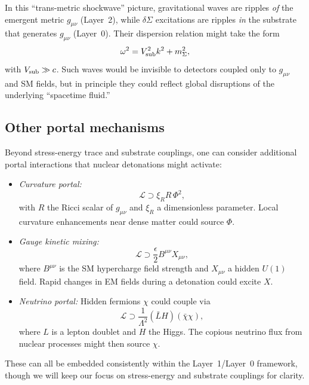 \documentclass[aps,prd,twocolumn,nofootinbib,superscriptaddress]{revtex4-2}
\begin{document}
In this ``trans-metric shockwave'' picture, gravitational waves are ripples \emph{of} the emergent metric $g_{\mu\nu}$ (Layer~2), while $\delta\Sigma$ excitations are ripples \emph{in} the substrate that generates $g_{\mu\nu}$ (Layer~0). Their dispersion relation might take the form
\begin{equation}
    \omega^2 = V_{\rm sub}^2 k^2 + m_\Sigma^2,
    \label{eq:sigma_dispersion}
\end{equation}
with $V_{\rm sub} \gg c$. Such waves would be invisible to detectors coupled only to $g_{\mu\nu}$ and SM fields, but in principle they could reflect global disruptions of the underlying ``spacetime fluid.''

\subsection{Other portal mechanisms}

Beyond stress-energy trace and substrate couplings, one can consider additional portal interactions that nuclear detonations might activate:
\begin{itemize}
    \item \textit{Curvature portal:}
    \begin{equation}
        \mathcal{L} \supset \xi_R R \, \Phi^2,
    \end{equation}
    with $R$ the Ricci scalar of $g_{\mu\nu}$ and $\xi_R$ a dimensionless parameter. Local curvature enhancements near dense matter could source $\Phi$.
    \item \textit{Gauge kinetic mixing:}
    \begin{equation}
        \mathcal{L} \supset \frac{\epsilon}{2} B^{\mu\nu} X_{\mu\nu},
    \end{equation}
    where $B^{\mu\nu}$ is the SM hypercharge field strength and $X_{\mu\nu}$ a hidden $U(1)$ field. Rapid changes in EM fields during a detonation could excite $X$.
    \item \textit{Neutrino portal:}
    Hidden fermions $\chi$ could couple via
    \begin{equation}
        \mathcal{L} \supset \frac{1}{\Lambda^2}
        (\bar{L} H)(\bar{\chi} \chi),
    \end{equation}
    where $L$ is a lepton doublet and $H$ the Higgs. The copious neutrino flux from nuclear processes might then source $\chi$.
\end{itemize}
These can all be embedded consistently within the Layer~1/Layer~0 framework, though we will keep our focus on stress-energy and substrate couplings for clarity.
\end{document}
